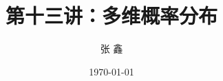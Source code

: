 \documentclass[Prob-All.tex]{subfiles}
\begin{document}
\title[概率论]{第十三讲：多维概率分布}
\author[张鑫 {\rm Email: x.zhang.seu@foxmail.com} ]{\large 张 鑫}
\date{\rm \today}

{ 
  \begin{frame}
    \titlepage
  \end{frame}
}

\addtocounter{framenumber}{-3}  %
\end{document}
